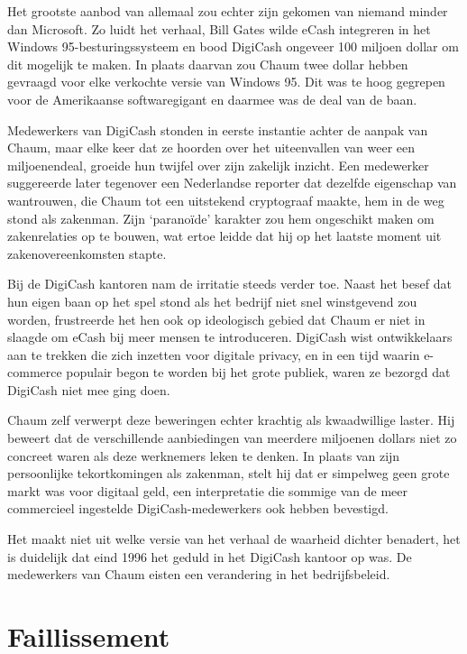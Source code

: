 \documentclass[
  a5paper,
  smalldemyvopaper,11pt,twoside,onecolumn,openright,extrafontsizes]{memoir}
\begin{document}
Het grootste aanbod van allemaal zou echter zijn gekomen van niemand
minder dan Microsoft. Zo luidt het verhaal, Bill Gates wilde eCash
integreren in het Windows 95-besturingssysteem en bood DigiCash ongeveer
100 miljoen dollar om dit mogelijk te maken. In plaats daarvan zou Chaum
twee dollar hebben gevraagd voor elke verkochte versie van Windows 95.
Dit was te hoog gegrepen voor de Amerikaanse softwaregigant en daarmee
was de deal van de baan.

Medewerkers van DigiCash stonden in eerste instantie achter de aanpak
van Chaum, maar elke keer dat ze hoorden over het uiteenvallen van weer
een miljoenendeal, groeide hun twijfel over zijn zakelijk inzicht. Een
medewerker suggereerde later tegenover een Nederlandse reporter dat
dezelfde eigenschap van wantrouwen, die Chaum tot een uitstekend
cryptograaf maakte, hem in de weg stond als zakenman. Zijn `paranoïde'
karakter zou hem ongeschikt maken om zakenrelaties op te bouwen, wat
ertoe leidde dat hij op het laatste moment uit zakenovereenkomsten
stapte.

Bij de DigiCash kantoren nam de irritatie steeds verder toe. Naast het
besef dat hun eigen baan op het spel stond als het bedrijf niet snel
winstgevend zou worden, frustreerde het hen ook op ideologisch gebied
dat Chaum er niet in slaagde om eCash bij meer mensen te introduceren.
DigiCash wist ontwikkelaars aan te trekken die zich inzetten voor
digitale privacy, en in een tijd waarin e-commerce populair begon te
worden bij het grote publiek, waren ze bezorgd dat DigiCash niet mee
ging doen.

Chaum zelf verwerpt deze beweringen echter krachtig als kwaadwillige
laster. Hij beweert dat de verschillende aanbiedingen van meerdere
miljoenen dollars niet zo concreet waren als deze werknemers leken te
denken. In plaats van zijn persoonlijke tekortkomingen als zakenman,
stelt hij dat er simpelweg geen grote markt was voor digitaal geld, een
interpretatie die sommige van de meer commercieel ingestelde
DigiCash-medewerkers ook hebben bevestigd.

Het maakt niet uit welke versie van het verhaal de waarheid dichter
benadert, het is duidelijk dat eind 1996 het geduld in het DigiCash
kantoor op was. De medewerkers van Chaum eisten een verandering in het
bedrijfsbeleid.

\section{Faillissement}\label{faillissement}
\end{document}
